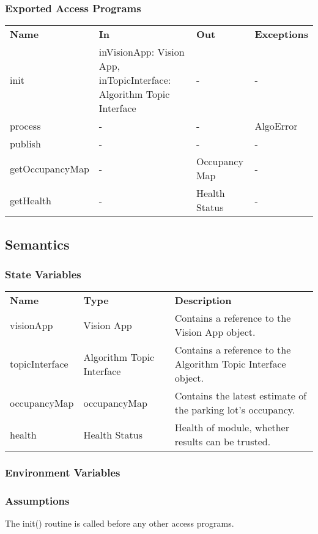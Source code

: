 \documentclass[12pt, titlepage]{article}
\begin{document}
\subsubsection{Exported Access Programs}
\begin{center}
\begin{tabular}{p{3.5cm} p{2.5cm} p{2.5cm} p{5cm}}
\hline
\textbf{Name} & \textbf{In} & \textbf{Out} & \textbf{Exceptions} \\
init & inVisionApp: Vision App, inTopicInterface: Algorithm Topic Interface & - & - \\
process & -  & - & AlgoError \\
publish & - & - & - \\
getOccupancyMap & - & Occupancy Map & - \\
getHealth & - & Health Status & - \\
\hline
\hline
\end{tabular}
\end{center}
\subsection{Semantics}
\subsubsection{State Variables}
\begin{center}
\begin{tabular}{p{3 cm} p{4cm} p{5cm} }
\hline
\textbf{Name} & \textbf{Type} & \textbf{Description}  \\
visionApp & Vision App & Contains a reference to the Vision App object. \\
topicInterface & Algorithm Topic Interface & Contains a reference to the Algorithm Topic Interface object.\\
occupancyMap & occupancyMap & Contains the latest estimate of the parking lot's occupancy. \\
health & Health Status & Health of module, whether results can be trusted.   \\
\hline
\hline
\end{tabular}
\end{center}
\subsubsection{Environment Variables}
\subsubsection{Assumptions}
The init() routine is called before any other access programs.
\end{document}
